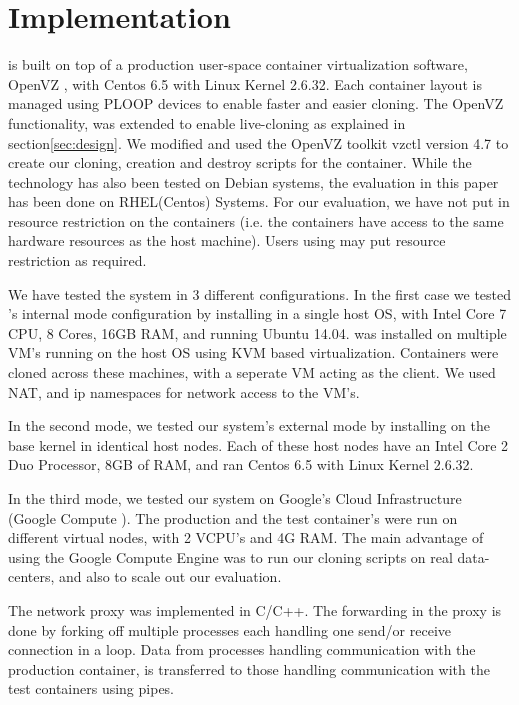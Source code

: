 
\section{Implementation}
\label{sec:implementation}

\parikshan is built on top of a production user-space container virtualization software, OpenVZ \cite{openvz}, with Centos 6.5 with Linux Kernel 2.6.32.
Each container layout is managed using PLOOP\cite{ploop} devices to enable faster and easier cloning.
The OpenVZ functionality, was extended to enable live-cloning as explained in section\ref{sec:design}.
We modified and used the OpenVZ toolkit vzctl version 4.7 to create our cloning, creation and destroy scripts for the container. 
While the technology has also been tested on Debian systems, the evaluation in this paper has been done on RHEL(Centos) Systems. 
For our evaluation, we have not put in resource restriction on the containers (i.e. the containers have access to the same hardware resources as the host machine).
Users using \parikshan may put resource restriction as required.

We have tested the system in 3 different configurations. 
In the first case we tested \parikshan 's internal mode configuration by installing \parikshan in a single host OS, with Intel Core 7 CPU, 8 Cores, 16GB RAM, and running Ubuntu 14.04. 
\parikshan was installed on multiple VM's running on the host OS using KVM based virtualization. 
Containers were cloned across these machines, with a seperate VM acting as the client.
We used NAT, and ip namespaces for network access to the VM's.

In the second mode, we tested our system's external mode by installing \parikshan on the base kernel in identical host nodes. 
Each of these host nodes have an Intel Core 2 Duo Processor, 8GB of RAM, and ran Centos 6.5 with Linux Kernel 2.6.32.

In the third mode, we tested our system on Google's Cloud Infrastructure (Google Compute \cite{gcompute}).
The production and the test container's were run on different virtual nodes, with 2 VCPU's and 4G RAM. 
The main advantage of using the Google Compute Engine was to run our cloning scripts on real data-centers, and also to scale out our evaluation. 

The network proxy was implemented in C/C++.
The forwarding in the proxy is done by forking off multiple processes each handling one send/or receive connection in a loop.
Data from processes handling communication with the production container, is  transferred to those handling communication with the test containers using pipes. 